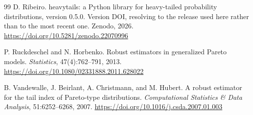 \documentclass[11pt]{article}
\begin{document}
\begin{thebibliography}{99}
D. Ribeiro.
\newblock heavytails: a Python library for heavy-tailed probability
distributions, version 0.5.0.
\newblock Version DOI, resolving to the release used here rather than to the
most recent one.
\newblock Zenodo, 2026.
\newblock \url{https://doi.org/10.5281/zenodo.22070996}

P. Ruckdeschel and N. Horbenko.
\newblock Robust estimators in generalized Pareto models.
\newblock \emph{Statistics}, 47(4):762--791, 2013.
\newblock \url{https://doi.org/10.1080/02331888.2011.628022}

B. Vandewalle, J. Beirlant, A. Christmann, and M. Hubert.
\newblock A robust estimator for the tail index of Pareto-type distributions.
\newblock \emph{Computational Statistics \& Data Analysis}, 51:6252--6268,
2007.
\newblock \url{https://doi.org/10.1016/j.csda.2007.01.003}

\end{thebibliography}
\end{document}

